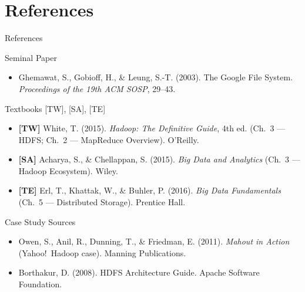 \documentclass[aspectratio=169,10pt]{beamer}
\begin{document}
\section*{References}

\begin{frame}{References}
  \begin{block}{Seminal Paper}
    \begin{itemize}
      \item Ghemawat, S., Gobioff, H., \& Leung, S.-T. (2003).
            The Google File System.
            \textit{Proceedings of the 19th ACM SOSP}, 29--43.
    \end{itemize}
  \end{block}
  \vspace{4pt}
  \begin{block}{Textbooks \textmd{[TW], [SA], [TE]}}
    \begin{itemize}
      \item \textbf{[TW]} White, T. (2015).
            \textit{Hadoop: The Definitive Guide}, 4th ed.
            (Ch.~3 — HDFS; Ch.~2 — MapReduce Overview). O'Reilly.
      \item \textbf{[SA]} Acharya, S., \& Chellappan, S. (2015).
            \textit{Big Data and Analytics}
            (Ch.~3 — Hadoop Ecosystem). Wiley.
      \item \textbf{[TE]} Erl, T., Khattak, W., \& Buhler, P. (2016).
            \textit{Big Data Fundamentals}
            (Ch.~5 — Distributed Storage). Prentice Hall.
    \end{itemize}
  \end{block}
  \vspace{4pt}
  \begin{block}{Case Study Sources}
    \begin{itemize}
      \item Owen, S., Anil, R., Dunning, T., \& Friedman, E. (2011).
            \textit{Mahout in Action} (Yahoo!\ Hadoop case).
            Manning Publications.
      \item Borthakur, D. (2008).
            HDFS Architecture Guide. Apache Software Foundation.
    \end{itemize}
  \end{block}
\end{frame}
\end{document}
